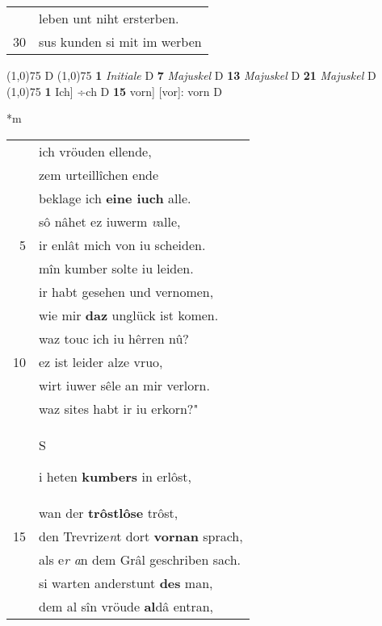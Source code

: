 \documentclass[8pt,a4paper,notitlepage]{article}
\begin{document}
\begin{table}[ht]
\begin{minipage}[t]{0.5\linewidth}
\begin{tabular}{rl}
 & leben unt niht ersterben.\\ 
30 & sus kunden si mit im werben\\ 
\end{tabular}
\scriptsize
\line(1,0){75} \newline
D \newline
\line(1,0){75} \newline
\textbf{1} \textit{Initiale} D  \textbf{7} \textit{Majuskel} D  \textbf{13} \textit{Majuskel} D  \textbf{21} \textit{Majuskel} D  \newline
\line(1,0){75} \newline
\textbf{1} Ich] ÷ch D \textbf{15} vorn] [vor]: vorn D \newline
\end{minipage}
\hspace{0.5cm}
\begin{minipage}[t]{0.5\linewidth}
\small
\begin{center}*m
\end{center}
\begin{tabular}{rl}
 & ich vröuden ellende,\\ 
 & zem urteillîchen ende\\ 
 & beklage ich \textbf{eine iuch} alle.\\ 
 & sô nâhet ez iuwerm \textit{v}alle,\\ 
5 & ir enlât mich von iu scheiden.\\ 
 & mîn kumber solte iu leiden.\\ 
 & ir habt gesehen und vernomen,\\ 
 & wie mir \textbf{daz} unglück ist komen.\\ 
 & waz touc ich iu hêrren nû?\\ 
10 & ez ist leider alze vruo,\\ 
 & wirt iuwer sêle an mir verlorn.\\ 
 & waz sites habt ir iu erkorn?"\\ 
 & \begin{large}S\end{large}i heten \textbf{kumbers} in erlôst,\\ 
 & wan der \textbf{trôstlôse} trôst,\\ 
15 & den Trevrize\textit{n}t dort \textbf{vornan} sprach,\\ 
 & als e\textit{r a}n dem Grâl geschriben sach.\\ 
 & si warten anderstunt \textbf{des} man,\\ 
 & dem al sîn vröude \textbf{al}dâ entran,\\ 

\end{tabular}
\end{minipage}
\end{table}
\end{document}
